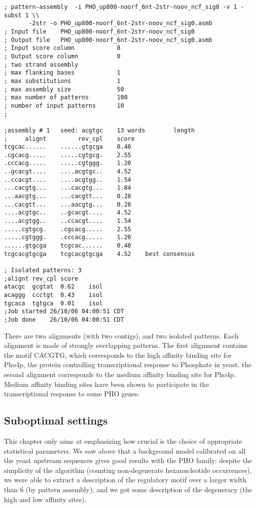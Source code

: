 {\color{OliveGreen} \begin{footnotesize} 
\begin{verbatim}
; pattern-assembly  -i PHO_up800-noorf_6nt-2str-noov_ncf_sig0 -v 1 -subst 1 \\
       -2str -o PHO_up800-noorf_6nt-2str-noov_ncf_sig0.asmb
; Input file    PHO_up800-noorf_6nt-2str-noov_ncf_sig0
; Output file   PHO_up800-noorf_6nt-2str-noov_ncf_sig0.asmb
; Input score column            8
; Output score column           0
; two strand assembly
; max flanking bases            1
; max substitutions             1
; max assembly size             50
; max number of patterns        100
; number of input patterns      10
;

;assembly # 1   seed: acgtgc    13 words        length 
;     alignt         rev_cpl    score
tcgcac......    ......gtgcga    0.40
.cgcacg.....    .....cgtgcg.    2.55
.cccacg.....    .....cgtggg.    1.20
..gcacgt....    ....acgtgc..    4.52
..ccacgt....    ....acgtgg..    1.54
...cacgtg...    ...cacgtg...    1.84
...aacgtg...    ...cacgtt...    0.28
...cacgtt...    ...aacgtg...    0.28
....acgtgc..    ..gcacgt....    4.52
....acgtgg..    ..ccacgt....    1.54
.....cgtgcg.    .cgcacg.....    2.55
.....cgtggg.    .cccacg.....    1.20
......gtgcga    tcgcac......    0.40
tcgcacgtgcga    tcgcacgtgcga    4.52    best consensus

; Isolated patterns: 3
;alignt rev_cpl score
atacgc  gcgtat  0.62    isol
acaggg  ccctgt  0.43    isol
tgcaca  tgtgca  0.01    isol
;Job started 26/10/06 04:00:51 CDT
;Job done    26/10/06 04:00:51 CDT
\end{verbatim} \end{footnotesize}
}

There are two alignments (with two contigs), and two isolated
patterns. Each alignment is made of strongly overlapping patterns. The
first alignment contains the motif CACGTG, which corresponds to the
high affinity binding site for Pho4p, the protein controlling
transcriptional response to Phosphate in yeast. the second alignment
corresponds to the medium affinity binding site for Pho4p. Medium
affinity binding sites have been shown to participate in the
transcriptional response to some PHO genes.

\subsection{Suboptimal settings}

This chapter only aims at emphasizing how crucial is the choice of
appropriate statistical parameters. We saw above that a background
model calibrated on all the yeast upstream sequences gives good
results with the PHO family: despite the simplicity of the algorithm
(counting non-degenerate hexanucleotide occurrences), we were able to
extract a description of the regulatory motif over a larger width than
6 (by pattern assembly), and we got some description of the degeneracy
(the high and low affinity sites).

